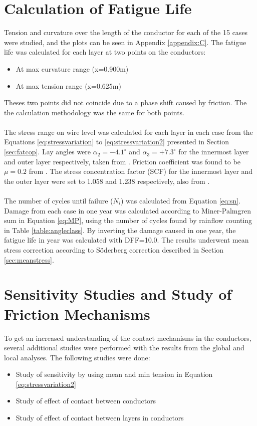 \section{Calculation of Fatigue Life}
\label{sec:fatiguelife}
Tension and curvature over the length of the conductor for each of the 15 cases were studied, and the plots can be seen in Appendix \ref{appendix:C}. The fatigue life was calculated for each layer at two points on the conductors: 
\begin{itemize}
\item At max curvature range (x=0.900m)
\item At max tension range  (x=0.625m)
\end{itemize}
Theses two points did not coincide due to a phase shift caused by friction. The the calculation methodology was the same for both points.  \\\\
The stress range on wire level was calculated for each layer in each case from the Equations \ref{eq:stressvariation} to \ref{eq:stressvariation2} presented in Section \ref{sec:fatcop}. Lay angles were $\alpha_2=-4.1^\circ$ and $\alpha_3=+7.3^\circ$ for the innermost layer and outer layer respectively, taken from \cite{Nasution2013}. Friction coefficient was found to be $\mu=0.2$ from \cite{NASUTION2014}. The stress concentration factor (SCF) for the innermost layer and the outer layer were set to 1.058 and 1.238 respectively, also from \cite{NASUTION2014}. \\\\
The number of cycles until failure ($N_i$) was calculated from Equation \ref{eq:sn}. Damage from each case in one year was calculated according to Miner-Palmgren sum in Equation \ref{eq:MP}, using the number of cycles found by rainflow counting in Table \ref{table:angleclass}. By inverting the damage caused in one year, the fatigue life in year was calculated with DFF=10.0. The results underwent mean stress correction according to Söderberg correction described in Section \ref{sec:meanstress}. 

\section{Sensitivity Studies and Study of Friction Mechanisms}
To get an increased understanding of the contact mechanisms in the conductors, several additional studies were performed with the results from the global and local analyses. The following studies were done:
\begin{itemize}
    \item Study of sensitivity by using mean and min tension in Equation \ref{eq:stressvariation2}
    \item Study of effect of contact between conductors
    \item Study of effect of contact between layers in conductors
\end{itemize}
